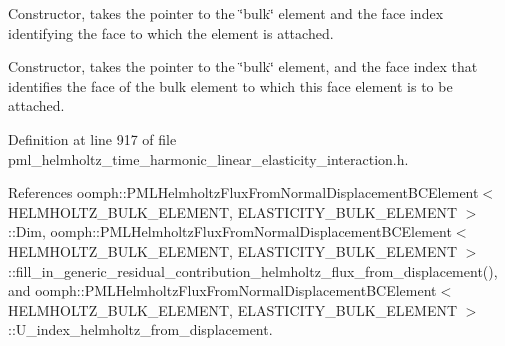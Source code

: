 Constructor, takes the pointer to the \char`\"{}bulk\char`\"{} element and the face index identifying the face to which the element is attached. 

Constructor, takes the pointer to the \char`\"{}bulk\char`\"{} element, and the face index that identifies the face of the bulk element to which this face element is to be attached. 

Definition at line 917 of file pml\+\_\+helmholtz\+\_\+time\+\_\+harmonic\+\_\+linear\+\_\+elasticity\+\_\+interaction.\+h.



References oomph\+::\+P\+M\+L\+Helmholtz\+Flux\+From\+Normal\+Displacement\+B\+C\+Element$<$ H\+E\+L\+M\+H\+O\+L\+T\+Z\+\_\+\+B\+U\+L\+K\+\_\+\+E\+L\+E\+M\+E\+N\+T, E\+L\+A\+S\+T\+I\+C\+I\+T\+Y\+\_\+\+B\+U\+L\+K\+\_\+\+E\+L\+E\+M\+E\+N\+T $>$\+::\+Dim, oomph\+::\+P\+M\+L\+Helmholtz\+Flux\+From\+Normal\+Displacement\+B\+C\+Element$<$ H\+E\+L\+M\+H\+O\+L\+T\+Z\+\_\+\+B\+U\+L\+K\+\_\+\+E\+L\+E\+M\+E\+N\+T, E\+L\+A\+S\+T\+I\+C\+I\+T\+Y\+\_\+\+B\+U\+L\+K\+\_\+\+E\+L\+E\+M\+E\+N\+T $>$\+::fill\+\_\+in\+\_\+generic\+\_\+residual\+\_\+contribution\+\_\+helmholtz\+\_\+flux\+\_\+from\+\_\+displacement(), and oomph\+::\+P\+M\+L\+Helmholtz\+Flux\+From\+Normal\+Displacement\+B\+C\+Element$<$ H\+E\+L\+M\+H\+O\+L\+T\+Z\+\_\+\+B\+U\+L\+K\+\_\+\+E\+L\+E\+M\+E\+N\+T, E\+L\+A\+S\+T\+I\+C\+I\+T\+Y\+\_\+\+B\+U\+L\+K\+\_\+\+E\+L\+E\+M\+E\+N\+T $>$\+::\+U\+\_\+index\+\_\+helmholtz\+\_\+from\+\_\+displacement.

\mbox{\label{classoomph_1_1PMLHelmholtzFluxFromNormalDisplacementBCElement_a4eaae55dc9bd4d6076cf9f6f75f06df3}} 
